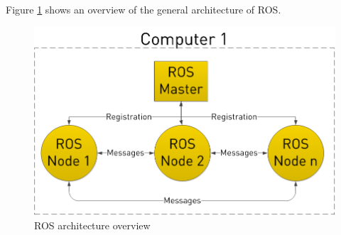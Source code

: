 
Figure \ref{fig:rosgraph} shows an overview of the general architecture of ROS.

\begin{figure}[h] 
\centerline{\includegraphics [width=0.5 \textwidth]{imgs/chapter2/rosgraph.png}}
\caption{ROS architecture overview \cite{rosbasics}}
\label{fig:rosgraph}
\end{figure}


